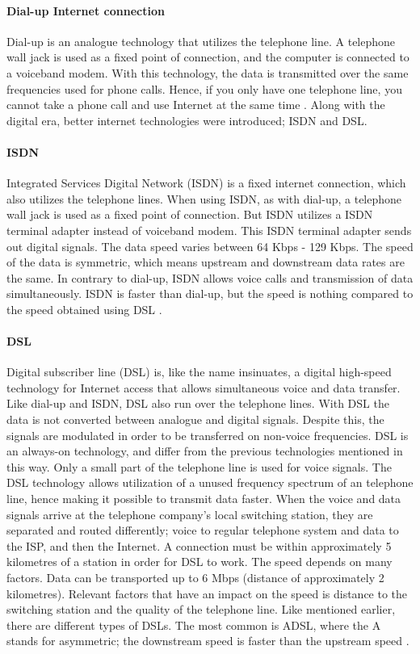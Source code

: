 \paragraph{Dial-up Internet connection}
Dial-up is an analogue technology that utilizes the telephone line. A telephone wall jack is used as a fixed point of connection, and the computer is connected to a voiceband modem. With this technology, the data is transmitted over the same frequencies used for phone calls. Hence, if you only have one telephone line, you cannot take a phone call and use Internet at the same time \cite{differentuplinks}. Along with the digital era, better internet technologies were introduced; ISDN and DSL. 

\paragraph{ISDN}
Integrated Services Digital Network (ISDN) is a fixed internet connection, which also utilizes the telephone lines. When using ISDN, as with dial-up, a telephone wall jack is used as a fixed point of connection. But ISDN utilizes a ISDN terminal adapter instead of voiceband modem. This ISDN terminal adapter sends out digital signals. The data speed varies between 64 Kbps - 129 Kbps. The speed of the data is symmetric, which means upstream and downstream data rates are the same. In contrary to dial-up, ISDN allows voice calls and transmission of data simultaneously. ISDN is faster than dial-up, but the speed is nothing compared to the speed obtained using DSL \cite{differentuplinks}. 

\paragraph{DSL}
Digital subscriber line (DSL) is, like the name insinuates, a digital high-speed technology for Internet access that allows simultaneous voice and data transfer. Like dial-up and ISDN, DSL also run over the telephone lines. With DSL the data is not converted between analogue and digital signals. Despite this, the signals are modulated in order to be transferred on non-voice frequencies. DSL is an always-on technology, and differ from the previous technologies mentioned in this way. Only a small part of the telephone line is used for voice signals. The DSL technology allows utilization of a unused frequency spectrum of an telephone line, hence making it possible to transmit data faster. When the voice and data signals arrive at the telephone company's local switching station, they are separated and routed differently; voice to regular telephone system and data to the ISP, and then the Internet. A connection must be within approximately 5 kilometres of a station in order for DSL to work. The speed depends on many factors. Data can be transported up to 6 Mbps (distance of approximately 2 kilometres). Relevant factors that have an impact on the speed is distance to the switching station and the quality of the telephone line. Like mentioned earlier, there are different types of DSLs. The most common is ADSL, where the A stands for asymmetric; the downstream speed is faster than the upstream speed \cite{differentuplinks}.

